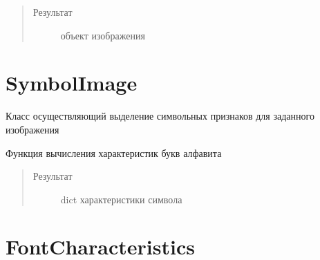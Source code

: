 \documentclass[letterpaper,10pt,russian]{sphinxmanual}
\begin{document}
\begin{fulllineitems}
\begin{fulllineitems}
\begin{quote}
\begin{description}
\item[{Результат}] \leavevmode
{\hyperref[\detokenize{BaseImage:core.LabImage}]{}} \textendash{} объект изображения

\end{description}\end{quote}

\end{fulllineitems}


\end{fulllineitems}



\section{SymbolImage}
\label{\detokenize{SymbolImage:symbolimage}}\label{\detokenize{SymbolImage::doc}}

\begin{fulllineitems}
\label{\detokenize{SymbolImage:SymbolImage.SymbolImage}}
Класс осуществляющий выделение символьных признаков для заданного изображения

\begin{fulllineitems}
\label{\detokenize{SymbolImage:SymbolImage.SymbolImage.calc_characteristics}}
Функция вычисления характеристик букв алфавита
\begin{quote}\begin{description}
\item[{Результат}] \leavevmode
dict \textendash{} характеристики символа

\end{description}\end{quote}

\end{fulllineitems}


\end{fulllineitems}



\section{FontCharacteristics}
\label{\detokenize{FontCharacteristics:fontcharacteristics}}\label{\detokenize{FontCharacteristics::doc}}
\end{document}
